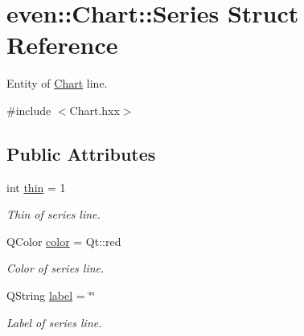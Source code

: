 \hypertarget{structeven_1_1_chart_1_1_series}{}\section{even\+:\+:Chart\+:\+:Series Struct Reference}
\label{structeven_1_1_chart_1_1_series}


Entity of \mbox{\hyperlink{classeven_1_1_chart}{Chart}} line.  




{\ttfamily \#include $<$Chart.\+hxx$>$}

\subsection*{Public Attributes}
\begin{DoxyCompactItemize}
\item 
\mbox{\label{structeven_1_1_chart_1_1_series_aa16dec3d3eb03dc07c8989f10f296c5c}} 
int \mbox{\hyperlink{structeven_1_1_chart_1_1_series_aa16dec3d3eb03dc07c8989f10f296c5c}{thin}} = 1
\begin{DoxyCompactList}\small\item\em Thin of series line. \end{DoxyCompactList}\item 
\mbox{\label{structeven_1_1_chart_1_1_series_a8c0c3a2bd10bbfdb7b475da736d53758}} 
Q\+Color \mbox{\hyperlink{structeven_1_1_chart_1_1_series_a8c0c3a2bd10bbfdb7b475da736d53758}{color}} = Qt\+::red
\begin{DoxyCompactList}\small\item\em Color of series line. \end{DoxyCompactList}\item 
\mbox{\label{structeven_1_1_chart_1_1_series_a31ffb651ba1799bb2cc10adad3fc0e01}} 
Q\+String \mbox{\hyperlink{structeven_1_1_chart_1_1_series_a31ffb651ba1799bb2cc10adad3fc0e01}{label}} = \char`\"{}\char`\"{}
\begin{DoxyCompactList}\small\item\em Label of series line. \end{DoxyCompactList}\item 
\mbox{\label{structeven_1_1_chart_1_1_series_a6fd1c5b7e9eb3dc6a208da843027ec62}} 

\end{DoxyCompactItemize}
